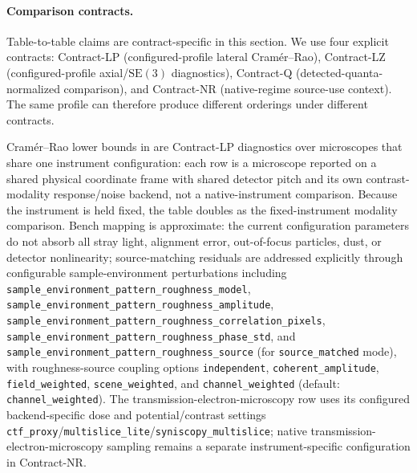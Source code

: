 \paragraph{Comparison contracts.} Table-to-table claims are contract-specific in this section. We use four explicit contracts: Contract-LP (configured-profile lateral Cram\'{e}r--Rao), Contract-LZ (configured-profile axial/\(\mathrm{SE}(3)\) diagnostics), Contract-Q (detected-quanta-normalized comparison), and Contract-NR (native-regime source-use context). The same profile can therefore produce different orderings under different contracts.

Cram\'{e}r--Rao lower bounds in  are Contract-LP diagnostics over microscopes that share one instrument configuration: each row is a microscope reported on a shared physical coordinate frame with shared detector pitch and its own contrast-modality response/noise backend, not a native-instrument comparison. Because the instrument is held fixed, the table doubles as the fixed-instrument modality comparison. Bench mapping is approximate: the current configuration parameters do not absorb all stray light, alignment error, out-of-focus particles, dust, or detector nonlinearity; source-matching residuals are addressed explicitly through configurable sample-environment perturbations including \texttt{sample\_environment\_pattern\_roughness\_model}, \texttt{sample\_environment\_pattern\_roughness\_amplitude}, \texttt{sample\_environment\_pattern\_roughness\_correlation\_pixels}, \texttt{sample\_environment\_pattern\_roughness\_phase\_std}, and \texttt{sample\_environment\_pattern\_roughness\_source} (for \texttt{source\_matched} mode), with roughness-source coupling options \texttt{independent}, \texttt{coherent\_amplitude}, \texttt{field\_weighted}, \texttt{scene\_weighted}, and \texttt{channel\_weighted} (default: \texttt{channel\_weighted}). The transmission-electron-microscopy row uses its configured backend-specific dose and potential/contrast settings \texttt{ctf\_proxy}/\texttt{multislice\_lite}/\texttt{syniscopy\_multislice}; native transmission-electron-microscopy sampling remains a separate instrument-specific configuration in Contract-NR.

